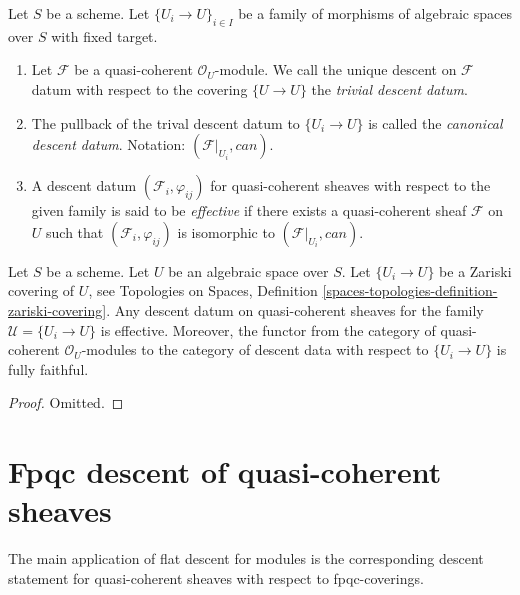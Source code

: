 \begin{definition}
\label{definition-descent-datum-effective-quasi-coherent}
Let $S$ be a scheme.
Let $\{U_i \to U\}_{i \in I}$ be a family of morphisms of algebraic
spaces over $S$ with fixed target.
\begin{enumerate}
\item Let $\mathcal{F}$ be a quasi-coherent $\mathcal{O}_U$-module.
We call the unique descent on $\mathcal{F}$ datum with respect to the covering
$\{U \to U\}$ the {\it trivial descent datum}.
\item The pullback of the trival descent datum to
$\{U_i \to U\}$ is called the {\it canonical descent datum}.
Notation: $(\mathcal{F}|_{U_i}, can)$.
\item A descent datum $(\mathcal{F}_i, \varphi_{ij})$
for quasi-coherent sheaves with respect to the given family
is said to be {\it effective} if there exists a quasi-coherent
sheaf $\mathcal{F}$ on $U$ such that $(\mathcal{F}_i, \varphi_{ij})$
is isomorphic to $(\mathcal{F}|_{U_i}, can)$.
\end{enumerate}
\end{definition}

\begin{lemma}
\label{lemma-zariski-descent-effective}
Let $S$ be a scheme. Let $U$ be an algebraic space over $S$.
Let $\{U_i \to U\}$ be a Zariski covering of $U$, see
Topologies on Spaces,
Definition \ref{spaces-topologies-definition-zariski-covering}.
Any descent datum on quasi-coherent sheaves
for the family $\mathcal{U} = \{U_i \to U\}$ is
effective. Moreover, the functor from the category of
quasi-coherent $\mathcal{O}_U$-modules to the category
of descent data with respect to $\{U_i \to U\}$ is fully faithful.
\end{lemma}

\begin{proof}
Omitted.
\end{proof}












\section{Fpqc descent of quasi-coherent sheaves}
\label{section-fpqc-descent-quasi-coherent}

\noindent
The main application of flat descent for modules is
the corresponding descent statement for quasi-coherent
sheaves with respect to fpqc-coverings.

